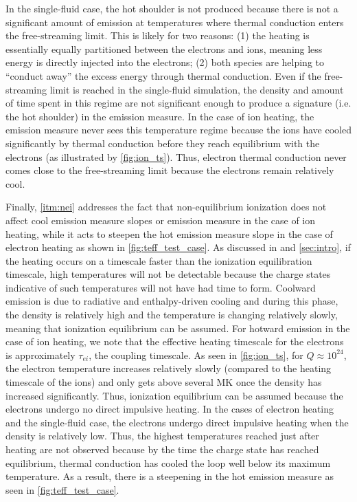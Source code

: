 \documentclass[apj]{emulateapj}
\begin{document}
	\par In the single-fluid case, the hot shoulder is not produced because there is not a significant amount of emission at temperatures where thermal conduction enters the free-streaming limit. This is likely for two reasons: (1) the heating is essentially equally partitioned between the electrons and ions, meaning less energy is directly injected into the electrons; (2) both species are helping to ``conduct away'' the excess energy through thermal conduction. Even if the free-streaming limit is reached in the single-fluid simulation, the density and amount of time spent in this regime are not significant enough to produce a signature (i.e. the hot shoulder) in the emission measure. In the case of ion heating, the emission measure never sees this temperature regime because the ions have cooled significantly by thermal conduction before they reach equilibrium with the electrons (as illustrated by \autoref{fig:ion_ts}). Thus, electron thermal conduction never comes close to the free-streaming limit because the electrons remain relatively cool.
	\par Finally, \autoref{itm:nei} addresses the fact that non-equilibrium ionization does not affect cool emission measure slopes or emission measure in the case of ion heating, while it acts to steepen the hot emission measure slope in the case of electron heating as shown in \autoref{fig:teff_test_case}. As discussed in  and \autoref{sec:intro}, if the heating occurs on a timescale faster than the ionization equilibration timescale, high temperatures will not be detectable because the charge states indicative of such temperatures will not have had time to form. Coolward emission is due to radiative and enthalpy-driven cooling and during this phase, the density is relatively high and the temperature is changing relatively slowly, meaning that ionization equilibrium can be assumed. For hotward emission in the case of ion heating, we note that the effective heating timescale for the electrons is approximately $\tau_{ei}$, the coupling timescale. As seen in \autoref{fig:ion_ts}, for $Q\approx10^{24}$, the electron temperature increases relatively slowly (compared to the heating timescale of the ions) and only gets above several MK once the density has increased significantly. Thus, ionization equilibrium can be assumed because the electrons undergo no direct impulsive heating. In the cases of electron heating and the single-fluid case, the electrons undergo direct impulsive heating when the density is relatively low. Thus, the highest temperatures reached just after heating are not observed because by the time the charge state has reached equilibrium, thermal conduction has cooled the loop well below its maximum temperature. As a result, there is a steepening in the hot emission measure as seen in \autoref{fig:teff_test_case}.
\end{document}
